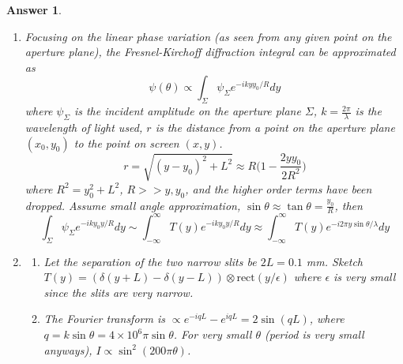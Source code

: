 \documentclass[a4paper]{article}
\newtheorem{ans}{Answer}[subsection]
\theoremstyle{new}
\begin{document}
\begin{ans}\leavevmode
\begin{enumerate}[label=(\roman*)]
\item Focusing on the linear phase variation (as seen from any given point on the aperture plane), the Fresnel-Kirchoff diffraction integral can be approximated as
$$\psi(\theta)\propto\int_\Sigma\psi_\Sigma e^{-ikyy_0/R}dy$$
where $\psi_\Sigma$ is the incident amplitude on the aperture plane $\Sigma$, $k=\frac{2\pi}{\lambda}$ is the wavelength of light used, $r$ is the distance from a point on the aperture plane $(x_0,y_0)$ to the point on screen $(x,y)$.
$$r=\sqrt{(y-y_0)^2+L^2}\approx R\bigg(1-\frac{2yy_0}{2R^2}\bigg)$$
where $R^2=y_0^2+L^2$, $R>>y,y_0$, and the higher order terms have been dropped. Assume small angle approximation, $\sin\theta\approx\tan\theta=\frac{y_0}{R}$, then
$$\int_\Sigma\psi_\Sigma e^{-iky_0y/R}dy\sim\int_{-\infty}^\infty T(y)e^{-iky_0y/R}dy\approx\int_{-\infty}^\infty T(y)e^{-i2\pi y\sin\theta/\lambda}dy$$
\item 
\begin{enumerate}[label=(\alph*)]
\item Let the separation of the two narrow slits be $2L=0.1$ mm. Sketch $T(y)=(\delta(y+L)-\delta(y-L))\otimes\text{rect}(y/\epsilon)$ where $\epsilon$ is very small since the slits are very narrow.
\begin{center}
\end{center}
\item The Fourier transform is $\propto e^{-iqL}-e^{iqL}=2\sin(qL)$, where $q=k\sin\theta=4\times 10^6\pi\sin\theta$. For very small $\theta$ (period is very small anyways), $I\propto\sin^2(200\pi\theta)$.
\begin{center}
\end{center}
\end{enumerate}
\end{enumerate}
\end{ans}
\end{document}
